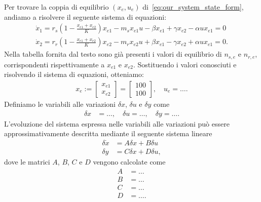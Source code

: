 \documentclass[a4paper, 11pt]{article}
\begin{document}
%
Per trovare la coppia di equilibrio $(x_e, u_e)$ di~\eqref{eq:our_system_state_form}, andiamo a risolvere il seguente sistema di equazioni:
%
\begin{align}
	\dot{x}_1=r_s \left( 1 - \frac{x_{e1} + x_{e2}}{K} \right) x_{e1} - m_s x_{e1} u- \beta x_{e1} + \gamma x_{e2} - \alpha u x_{e1} = 0 
    \\
    \dot{x}_2=r_r \left( 1 - \frac{x_{e1} + x_{e2}}{K} \right) x_{e2} - m_r x_{e2} u + \beta x_{e1} - \gamma x_{e2} + \alpha u x_{e1} = 0.
\end{align}
%
Nella tabella fornita dal testo sono già presenti i valori di equilibrio di \(n_{s,e}\) e \(n_{r,e}\), corrispondenti rispettivamente a \(x_{e1}\) e \(x_{e2}\).
Sostituendo i valori conosciuti e risolvendo il sistema di equazioni, otteniamo:
%
\begin{align}
	x_e := 
    \begin{bmatrix} x_{e1} \\ x_{e2} \end{bmatrix} = 
    \begin{bmatrix} 100 \\ 100 \end{bmatrix},
    \quad u_e = \dots.\label{eq:equilibirum_pair}
\end{align}
%
Definiamo le variabili alle variazioni $\delta x$, $\delta u$ e $\delta y$ come 
%
\begin{align*}
	\delta x &= \dots, 
	\quad
	\delta u = \dots, 
	\quad
	\delta y = \dots.
\end{align*}
%
L'evoluzione del sistema espressa nelle variabili alle variazioni pu\`o essere approssimativamente descritta mediante il seguente sistema lineare
%
\begin{subequations}\label{eq:linearized_system}
\begin{align}
	\delta \dot{x} &= A\delta x + B\delta u
	\\
	\delta y &= C\delta x + D\delta u,
\end{align}
\end{subequations}
%
dove le matrici $A$, $B$, $C$ e $D$ vengono calcolate come
%
\begin{subequations}\label{eq:matrices}
\begin{align}
	A &= \dots
	\\
	B &= \dots
	\\
	C &= \dots
	\\
	D &= \dots.
\end{align}
\end{subequations}
%
\end{document}
